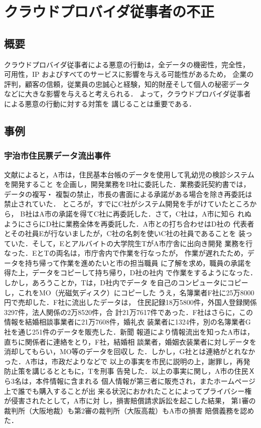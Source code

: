 \section{クラウドプロバイダ従事者の不正}

\subsection{概要}
クラウドプロバイダ従事者による悪意の行動は，全データの機密性，完全性，
可用性，IP およびすべてのサービスに影響を与える可能性があるため，
企業の評判，顧客の信頼，従業員の忠誠心と経験，知的財産そして個人の秘密データ
などに大きな影響を与えると考えられる．
よって，クラウドプロバイダ従事者による悪意の行動に対する対策を
講じることは重要である．


\subsection{事例}

\subsubsection{宇治市住民票データ流出事件}
文献\cite{uzi}によると，A市は，住民基本台帳のデータを使用して乳幼児の検診システムを開発すること
を企画し，開発業務をB社に委託した．業務委託契約書では，データの複写・
複製の禁止，市長の書面による承諾がある場合を除き再委託は禁止されていた．
ところが，すでにC社がシステム開発を手がけていたところから，
B社はA市の承諾を得てC社に再委託した．さて，C社は，A市に知ら
れぬようにさらにD社に業務全体を再委託した．A市との打ち合わせはD社の
代表者とその社員Eが行ないましたが，C社の名刺を使いC社の社員であることを
装っていた．そして，Eとアルバイトの大学院生TがA市庁舎に出向き開発
業務を行なった．EとTの両名は，市庁舎内で作業を行なったが，
作業が遅れたため，データを持ち帰って作業を進めたいと市の担当職員
に了解を求め，職員の承諾を得た上，データをコピーして持ち帰り，D社の社内
で作業をするようになった．しかし，あろうことか，Tは，D社内でデータ
を自己のコンピュータにコピーし，これをMO（光磁気ディスク）にコピーした
うえ，名簿業者F社に25万8000円で売却した．F社に流出したデータは，
住民記録18万5800件，外国人登録関係3297件，法人関係の2万8520件，合
計21万7617件であった．F社はさらに，この情報を結婚相談事業者に21万7608件，婚礼衣
装業者に1324件，別の名簿業者G社を通じ251件のデータを販売した．新聞
報道により情報流出を知ったA市は，直ちに関係者に連絡をとり，F社，結婚相
談業者，婚姻衣装業者に対しデータを消却してもらい，MO等のデータを回収し
た．しかし，G社とは連絡がとれなかった．A市は，市政だよりなどで
以上の事実を市民に説明の上，謝罪し，再発防止策を講じるとともに，Tを刑事
告発した．以上の事実に関し，A市の住民Ｘら3名は，本件情報に含まれる
個人情報が第三者に販売され，またホームページ上で誰でも購入することが出
来る状況におかれたことによってプライバシー権が侵害されたとして，A市に対
し，損害賠償請求訴訟を起こした結果，
第1審の裁判所（大阪地裁）も第2審の裁判所（大阪高裁）もA市の損害
賠償義務を認めた．

